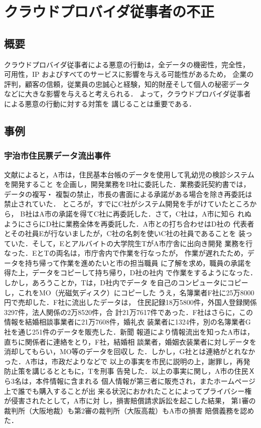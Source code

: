 \section{クラウドプロバイダ従事者の不正}

\subsection{概要}
クラウドプロバイダ従事者による悪意の行動は，全データの機密性，完全性，
可用性，IP およびすべてのサービスに影響を与える可能性があるため，
企業の評判，顧客の信頼，従業員の忠誠心と経験，知的財産そして個人の秘密データ
などに大きな影響を与えると考えられる．
よって，クラウドプロバイダ従事者による悪意の行動に対する対策を
講じることは重要である．


\subsection{事例}

\subsubsection{宇治市住民票データ流出事件}
文献\cite{uzi}によると，A市は，住民基本台帳のデータを使用して乳幼児の検診システムを開発すること
を企画し，開発業務をB社に委託した．業務委託契約書では，データの複写・
複製の禁止，市長の書面による承諾がある場合を除き再委託は禁止されていた．
ところが，すでにC社がシステム開発を手がけていたところから，
B社はA市の承諾を得てC社に再委託した．さて，C社は，A市に知ら
れぬようにさらにD社に業務全体を再委託した．A市との打ち合わせはD社の
代表者とその社員Eが行ないましたが，C社の名刺を使いC社の社員であることを
装っていた．そして，Eとアルバイトの大学院生TがA市庁舎に出向き開発
業務を行なった．EとTの両名は，市庁舎内で作業を行なったが，
作業が遅れたため，データを持ち帰って作業を進めたいと市の担当職員
に了解を求め，職員の承諾を得た上，データをコピーして持ち帰り，D社の社内
で作業をするようになった．しかし，あろうことか，Tは，D社内でデータ
を自己のコンピュータにコピーし，これをMO（光磁気ディスク）にコピーした
うえ，名簿業者F社に25万8000円で売却した．F社に流出したデータは，
住民記録18万5800件，外国人登録関係3297件，法人関係の2万8520件，合
計21万7617件であった．F社はさらに，この情報を結婚相談事業者に21万7608件，婚礼衣
装業者に1324件，別の名簿業者G社を通じ251件のデータを販売した．新聞
報道により情報流出を知ったA市は，直ちに関係者に連絡をとり，F社，結婚相
談業者，婚姻衣装業者に対しデータを消却してもらい，MO等のデータを回収し
た．しかし，G社とは連絡がとれなかった．A市は，市政だよりなどで
以上の事実を市民に説明の上，謝罪し，再発防止策を講じるとともに，Tを刑事
告発した．以上の事実に関し，A市の住民Ｘら3名は，本件情報に含まれる
個人情報が第三者に販売され，またホームページ上で誰でも購入することが出
来る状況におかれたことによってプライバシー権が侵害されたとして，A市に対
し，損害賠償請求訴訟を起こした結果，
第1審の裁判所（大阪地裁）も第2審の裁判所（大阪高裁）もA市の損害
賠償義務を認めた．

